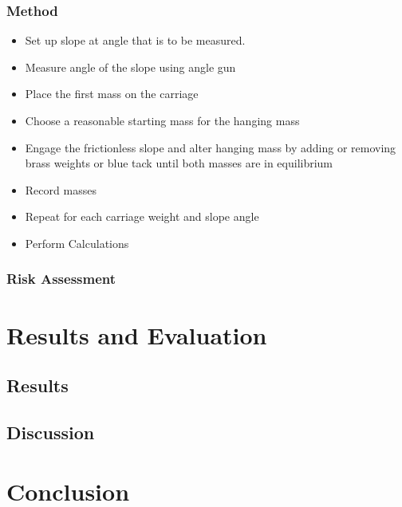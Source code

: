 \documentclass[11pt,a4paper]{article}
\begin{document}
\subsubsection{Method}
\begin{itemize}
	\item Set up slope at angle that is to be measured.
	\item Measure angle of the slope using angle gun
	\item Place the first mass on the carriage
	\item Choose a reasonable starting mass for the hanging mass
	\item Engage the frictionless slope and alter hanging mass by adding or removing brass weights or blue tack until both masses are in equilibrium
	\item Record masses
	\item Repeat for each carriage weight and slope angle
	\item Perform Calculations
	
	 
\end{itemize}


\subsubsection{Risk Assessment}

\section{Results and Evaluation}
\subsection{Results}
\subsection{Discussion}


\section{Conclusion}

	
	
	
\end{document}
